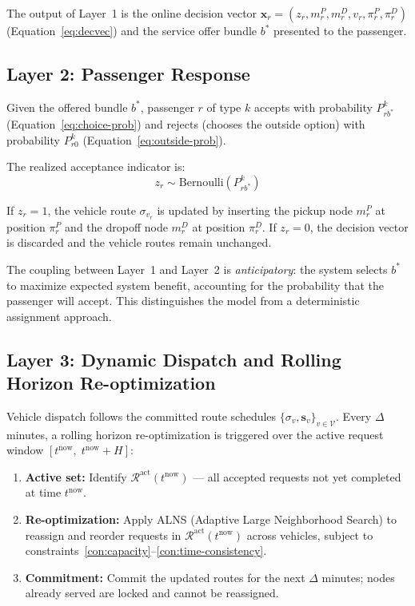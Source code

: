 The output of Layer~1 is the online decision vector
$\mathbf{x}_r = (z_r, m_r^P, m_r^D, v_r, \pi_r^P, \pi_r^D)$
(Equation~\ref{eq:decvec}) and the service offer bundle $b^*$ presented to the passenger.

\subsection*{Layer 2: Passenger Response}\label{sec:layer2}

Given the offered bundle $b^*$, passenger $r$ of type $k$ accepts with probability
$P_{rb^*}^k$ (Equation~\ref{eq:choice-prob}) and rejects (chooses the outside option) with
probability $P_{r0}^k$ (Equation~\ref{eq:outside-prob}).

The realized acceptance indicator is:
\begin{equation}\label{eq:acceptance-indicator}
  z_r \sim \text{Bernoulli}(P_{rb^*}^k)
\end{equation}

If $z_r = 1$, the vehicle route $\sigma_{v_r}$ is updated by inserting the pickup node
$m_r^P$ at position $\pi_r^P$ and the dropoff node $m_r^D$ at position $\pi_r^D$.
If $z_r = 0$, the decision vector is discarded and the vehicle routes remain unchanged.

The coupling between Layer~1 and Layer~2 is \emph{anticipatory}: the system selects $b^*$
to maximize expected system benefit, accounting for the probability that the passenger will
accept. This distinguishes the model from a deterministic assignment approach.

\subsection*{Layer 3: Dynamic Dispatch and Rolling Horizon Re-optimization}\label{sec:layer3}

Vehicle dispatch follows the committed route schedules
$\{\sigma_v, \mathbf{s}_v\}_{v \in \mathcal{V}}$.
Every $\Delta$ minutes, a rolling horizon re-optimization is triggered over the active
request window $[t^{\text{now}},\; t^{\text{now}} + H]$:

\begin{enumerate}
  \item \textbf{Active set:} Identify $\mathcal{R}^{\text{act}}(t^{\text{now}})$ --- all
        accepted requests not yet completed at time $t^{\text{now}}$.
  \item \textbf{Re-optimization:} Apply ALNS (Adaptive Large Neighborhood Search) to
        reassign and reorder requests in $\mathcal{R}^{\text{act}}(t^{\text{now}})$ across
        vehicles, subject to constraints~\ref{con:capacity}--\ref{con:time-consistency}.
  \item \textbf{Commitment:} Commit the updated routes for the next $\Delta$ minutes;
        nodes already served are locked and cannot be reassigned.
\end{enumerate}

